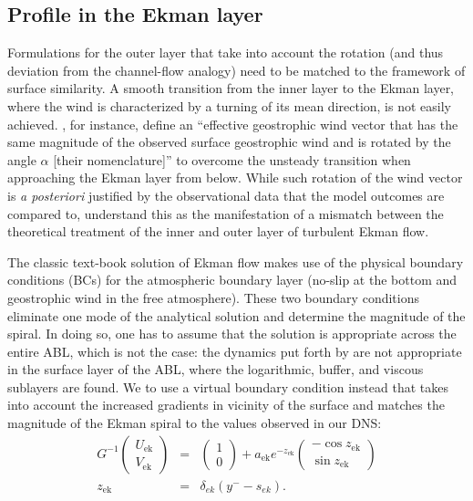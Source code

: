 \documentclass[a4paper,11pt]{amsart}
\begin{document}
\subsection{Profile in the Ekman layer}
\label{sec:ekman}
%
Formulations for the outer layer that take into account the rotation
(and thus deviation from the channel-flow analogy)
need to be matched to the framework of surface similarity.
%
A smooth transition from the inner layer to the Ekman layer, where the wind is characterized by a turning
of its mean direction, is not easily achieved. 
%
\cite{optis:BM2014}, for instance, define an ``effective geostrophic wind vector that has the same magnitude of the
observed surface geostrophic wind and is rotated by the angle $\alpha$ [their nomenclature]'' to overcome the
unsteady transition when approaching the Ekman layer from below.
%
While such rotation of the wind vector is \emph{a posteriori} justified by the observational data that the model outcomes are compared to, understand this as the manifestation of a mismatch between the theoretical treatment of the inner and outer layer of
turbulent Ekman flow.
%
\par
%
The classic text-book solution of Ekman flow makes use of the physical boundary conditions (BCs) for the atmospheric
boundary layer (no-slip at the bottom and geostrophic wind in the free atmosphere).
%
These two boundary conditions eliminate one mode of the analytical solution and determine the magnitude of
the spiral.
%
In doing so, one has to assume that the solution is appropriate across the entire ABL, which is not the case:
the dynamics put forth by \cite{ekman:AMA1905} are not appropriate in the surface layer of the ABL, where
the logarithmic, buffer, and viscous sublayers are found. 
%
We to use a virtual boundary condition instead that takes into account the increased gradients in vicinity of
the surface and matches the magnitude of the Ekman spiral to the values observed in our DNS:
\begin{subequations} 
\begin{eqnarray}
  G^{-1}\left(\begin{array}{c} 
    U_\mathrm{ek}\\ 
    V_\mathrm{ek}
  \end{array}\right)  &=& \left(\begin{array}{c} 1 \\ 0 \end{array}\right) 
  + a_\mathrm{ek} e^{-z_\mathrm{ek}} \left(\begin{array}{r}
    -\cos z_\mathrm{ek} \\ 
    \sin z_\mathrm{ek}
  \end{array}\right)  \\
  z_\mathrm{ek} &=& \delta_{ek} (y^- -s_{ek}). 
\end{eqnarray}
\end{subequations}
\end{document}

